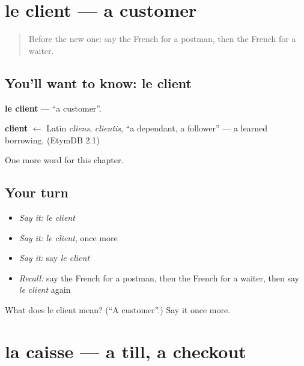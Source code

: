 \section[le client]{le client — a customer}

\label{lesson:FR-C125-client}



\begin{quote}
Before the new one: say the French for a postman, then the French for a waiter.
\end{quote}

\subsection*{You'll want to know: le client}
\textbf{le client} — \textquotedblleft{}a customer\textquotedblright{}.

\begin{cousinweb}
\textbf{client} $\leftarrow$ Latin \emph{cliens}, \emph{clientis}, \textquotedblleft{}a dependant, a follower\textquotedblright{} — a learned borrowing. (EtymDB 2.1)
\end{cousinweb}

\begin{grammarlens}[title={What you've built}]
One more word for this chapter.
\end{grammarlens}

\subsection*{Your turn}
\begin{itemize}
\raggedright
  \item \emph{Say it:} \emph{le client}
  \item \emph{Say it:} \emph{le client}, once more
  \item \emph{Say it:} say \emph{le client}
  \item \emph{Recall:} say the French for a postman, then the French for a waiter, then say \emph{le client} again
\end{itemize}

\begin{tcolorbox}[breakable,colback=teal!4,colframe=teal!35!black,title={Before you move on}]
What does le client mean? (\textquotedblleft{}A customer\textquotedblright{}.) Say it once more.
\end{tcolorbox}
\section[la caisse]{la caisse — a till, a checkout}

